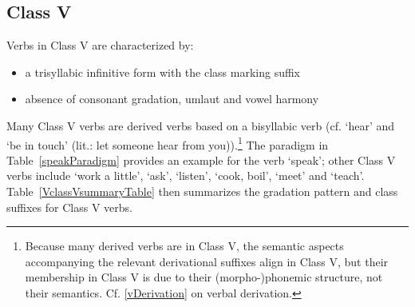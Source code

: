 
\subsection{Class V}\label{VclassV}
Verbs in Class V are characterized by: 
\begin{itemize}
\item{a trisyllabic infinitive form with the class marking suffix }
\item{absence of consonant gradation, umlaut and vowel harmony} 
\end{itemize}
Many Class V verbs are derived verbs based on a bisyllabic verb (cf.  ‘hear’ and  ‘be in touch’ (lit.: let someone hear from you)).\footnote{Because many derived verbs are in Class V, the semantic aspects accompanying the relevant derivational suffixes align in Class V, but their membership in Class V is due to their \mbox{(morpho-)phonemic} structure, not their semantics. Cf. \SEC\ref{vDerivation} on verbal derivation.} 
The paradigm in Table~\vref{speakParadigm} provides an example for the verb  ‘speak’; 
other Class V verbs include  ‘work a little’,  ‘ask’,  ‘listen’,  ‘cook, boil’,  ‘meet’ and  ‘teach’. 
Table~\ref{VclassVsummaryTable} then summarizes the gradation pattern and class suffixes for Class V verbs. %
